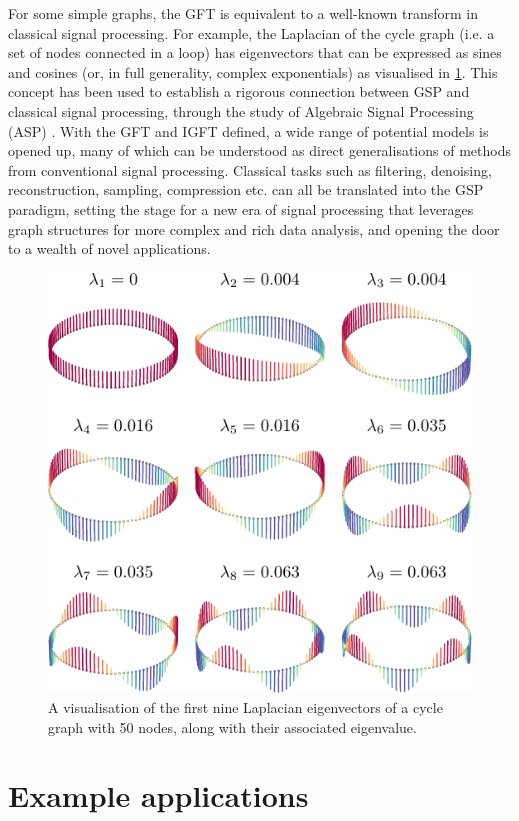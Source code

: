 For some simple graphs, the GFT is equivalent to a well-known transform in classical signal processing. For example, the Laplacian of the cycle graph (i.e. a set of nodes connected in a loop) has eigenvectors that can be expressed as sines and cosines (or, in full generality, complex exponentials) as visualised in \cref{fig:cycle_eighs}. This concept has been used to establish a rigorous connection between GSP and classical signal processing, through the study of Algebraic Signal Processing (ASP) \citep{Puschel2003, Sandryhaila2013}. With the GFT and IGFT defined, a wide range of potential models is opened up, many of which can be understood as direct generalisations of methods from conventional signal processing. Classical tasks such as filtering, denoising, reconstruction, sampling, compression etc. can all be translated into the GSP paradigm, setting the stage for a new era of signal processing that leverages graph structures for more complex and rich data analysis, and opening the door to a wealth of novel applications.

\begin{figure}[t]
	\centering
		\includegraphics[width=0.65\linewidth]{Figures/loop_plot.pdf}
        \caption[A visualisation of the Laplacian eigenvectors of the cycle graph]{A visualisation of the first nine Laplacian eigenvectors of a cycle graph with 50 nodes, along with their associated eigenvalue.}
	\label{fig:cycle_eighs}
\end{figure}


\newpage

\section{Example applications}

